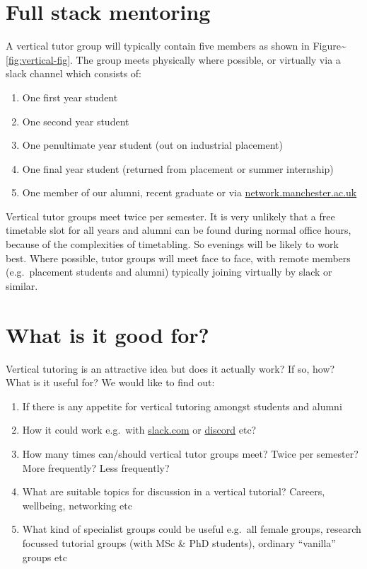 \documentclass[12pt,]{book}
\providecommand{\tightlist}{%
  \setlength{\itemsep}{0pt}\setlength{\parskip}{0pt}}
\begin{document}
\hypertarget{full-stack-mentoring}{%
\section{Full stack mentoring}\label{full-stack-mentoring}}

A vertical tutor group will typically contain five members as shown in Figure\textasciitilde{}\ref{fig:vertical-fig}. The group meets physically where possible, or virtually via a slack channel which consists of:

\begin{enumerate}
\def\labelenumi{\arabic{enumi}.}
\tightlist
\item
  One first year student
\item
  One second year student
\item
  One penultimate year student (out on industrial placement)
\item
  One final year student (returned from placement or summer internship)
\item
  One member of our alumni, recent graduate or via \href{https://www.network.manchester.ac.uk/}{network.manchester.ac.uk}
\end{enumerate}

Vertical tutor groups meet twice per semester. It is very unlikely that a free timetable slot for all years and alumni can be found during normal office hours, because of the complexities of timetabling. So evenings will be likely to work best. Where possible, tutor groups will meet face to face, with remote members (e.g.~placement students and alumni) typically joining virtually by slack or similar.

\hypertarget{what-is-it-good-for}{%
\section{What is it good for?}\label{what-is-it-good-for}}

Vertical tutoring is an attractive idea but does it actually work? If so, how? What is it useful for? We would like to find out:

\begin{enumerate}
\def\labelenumi{\arabic{enumi}.}
\tightlist
\item
  If there is any appetite for vertical tutoring amongst students and alumni
\item
  How it could work e.g.~with \href{https://slack.com}{slack.com} or \href{https://discordapp.com/}{discord} etc?
\item
  How many times can/should vertical tutor groups meet? Twice per semester? More frequently? Less frequently?
\item
  What are suitable topics for discussion in a vertical tutorial? Careers, wellbeing, networking etc
\item
  What kind of specialist groups could be useful e.g.~all female groups, research focussed tutorial groups (with MSc \& PhD students), ordinary ``vanilla'' groups etc
\end{enumerate}
\end{document}
